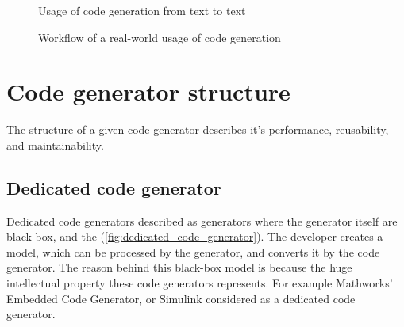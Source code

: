 \begin{figure}
	\centering
	\caption{Usage of code generation from text to text}
\label{fig:model_transformations}
\end{figure}

\begin{figure}
	\centering
	\caption{Workflow of a real-world usage of code generation}
\label{fig:model_transformation_cpp}
\end{figure}

\section{Code generator structure}

The structure of a given code generator describes it's performance, reusability, and maintainability.

\subsection{Dedicated code generator}
\label{subsec:dedicated_code_generator}

Dedicated code generators described as generators where the generator itself are black box, and the (\cref{fig:dedicated_code_generator}). The developer creates a model, which can be processed by the generator, and converts it by the code generator. The reason behind this black-box model is because the huge intellectual property these code generators represents. For example Mathworks' Embedded Code Generator, or Simulink \citep{MATHWORKS_ECG}\citep{MATHWORKS_SIMULINK} considered as a dedicated code generator.

